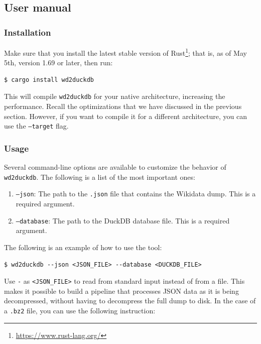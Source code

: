 \subsection{User manual}

\subsubsection{Installation}

Make sure that you install the latest stable version of Rust\footnote{\url{https://www.rust-lang.org/}}; that is, as of May 5th, version 1.69 or later, then run:

\begin{verbatim}
$ cargo install wd2duckdb
\end{verbatim}

This will compile \texttt{wd2duckdb} for your native architecture, increasing the performance. Recall the optimizations that we have discussed in the previous section. However, if you want to compile it for a different architecture, you can use the \texttt{--target} flag.

\subsubsection{Usage}

Several command-line options are available to customize the behavior of \texttt{wd2duckdb}. The following is a list of the most important ones:

\begin{enumerate}
    \item \texttt{--json}: The path to the \texttt{.json} file that contains the Wikidata dump. This is a required argument.
    \item \texttt{--database}: The path to the DuckDB database file. This is a required argument.
\end{enumerate}

The following is an example of how to use the tool:

\begin{verbatim}
$ wd2duckdb --json <JSON_FILE> --database <DUCKDB_FILE>
\end{verbatim}

Use \texttt{-} as \texttt{<JSON\_FILE>} to read from standard input instead of from a file. This makes it possible to build a pipeline that processes JSON data as it is being decompressed, without having to decompress the full dump to disk. In the case of a \texttt{.bz2} file, you can use the following instruction:

